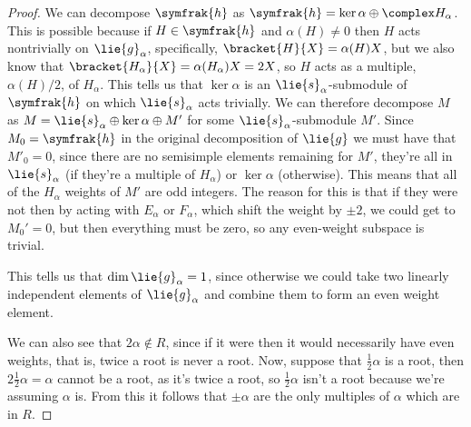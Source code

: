 \documentclass[fleqn]{NotesClass}
\newcommand{\csa}{\symfrak{h}}
\begin{document}
\begin{lma}{}{}
\begin{proof}
            We can decompose \(\csa\) as \(\csa = \ker \alpha \oplus \complex H_\alpha\).
            This is possible because if \(H \in \csa\) and \(\alpha(H) \ne 0\) then \(H\) acts nontrivially on \(\lie{g}_\alpha\), specifically, \(\bracket{H}{X} = \alpha(H)X\), but we also know that \(\bracket{H_\alpha}{X} = \alpha(H_\alpha)X = 2X\), so \(H\) acts as a multiple, \(\alpha(H)/2\), of \(H_\alpha\).
            This tells us that \(\ker \alpha\) is an \(\lie{s}_\alpha\)-submodule of \(\csa\) on which \(\lie{s}_\alpha\) acts trivially.
            We can therefore decompose \(M\) as \(M = \lie{s}_\alpha \oplus \ker \alpha \oplus M'\) for some \(\lie{s}_\alpha\)-submodule \(M'\).
            Since \(M_0 = \csa\) in the original decomposition of \(\lie{g}\) we must have that \(M'_0 = 0\), since there are no semisimple elements remaining for \(M'\), they're all in \(\lie{s}_\alpha\) (if they're a multiple of \(H_\alpha\)) or \(\ker \alpha\) (otherwise).
            This means that all of the \(H_\alpha\) weights of \(M'\) are odd integers.
            The reason for this is that if they were not then by acting with \(E_\alpha\) or \(F_\alpha\), which shift the weight by \(\pm 2\), we could get to \(M_0' = 0\), but then everything must be zero, so any even-weight subspace is trivial.
            
            This tells us that \(\dim \lie{g}_\alpha = 1\), since otherwise we could take two linearly independent elements of \(\lie{g}_\alpha\) and combine them to form an even weight element.
            
            We can also see that \(2\alpha \notin R\), since if it were then it would necessarily have even weights, that is, twice a root is never a root.
            Now, suppose that \(\frac{1}{2}\alpha\) is a root, then \(2 \frac{1}{2}\alpha = \alpha\) cannot be a root, as it's twice a root, so \(\frac{1}{2}\alpha\) isn't a root because we're assuming \(\alpha\) is.
            From this it follows that \(\pm \alpha\) are the only multiples of \(\alpha\) which are in \(R\).
        \end{proof}
    \end{lma}
    
    
    
    
    
    
    
    
    
    
    
%	
	
	\backmatter
	\renewcommand{\glossaryname}{Acronyms}
	\printglossary[acronym]
	\printindex
\end{document}

